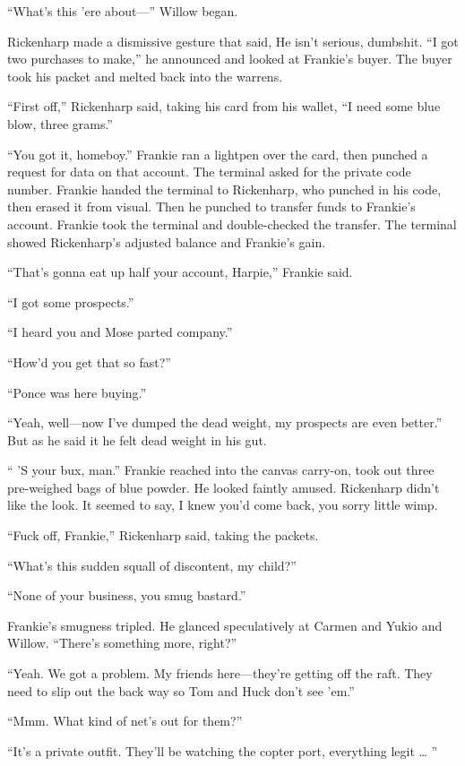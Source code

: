 “What’s this ’ere about—” Willow began.

Rickenharp made a dismissive gesture that said, He isn’t serious, dumbshit. “I got two purchases to make,” he announced and looked at Frankie’s buyer. The buyer took his packet and melted back into the warrens.

“First off,” Rickenharp said, taking his card from his wallet, “I need some blue blow, three grams.”

“You got it, homeboy.” Frankie ran a lightpen over the card, then punched a request for data on that account. The terminal asked for the private code number. Frankie handed the terminal to Rickenharp, who punched in his code, then erased it from visual. Then he punched to transfer funds to Frankie’s account. Frankie took the terminal and double-checked the transfer. The terminal showed Rickenharp’s adjusted balance and Frankie’s gain.

“That’s gonna eat up half your account, Harpie,” Frankie said.

“I got some prospects.”

“I heard you and Mose parted company.”

“How’d you get that so fast?”

“Ponce was here buying.”

“Yeah, well—now I’ve dumped the dead weight, my prospects are even better.” But as he said it he felt dead weight in his gut.

“ ’S your bux, man.” Frankie reached into the canvas carry-on, took out three pre-weighed bags of blue powder. He looked faintly amused. Rickenharp didn’t like the look. It seemed to say, I knew you’d come back, you sorry little wimp.

“Fuck off, Frankie,” Rickenharp said, taking the packets.

“What’s this sudden squall of discontent, my child?”

“None of your business, you smug bastard.”

Frankie’s smugness tripled. He glanced speculatively at Carmen and Yukio and Willow. “There’s something more, right?”

“Yeah. We got a problem. My friends here—they’re getting off the raft. They need to slip out the back way so Tom and Huck don’t see ’em.”

“Mmm. What kind of net’s out for them?”

“It’s a private outfit. They’ll be watching the copter port, everything legit … ”

